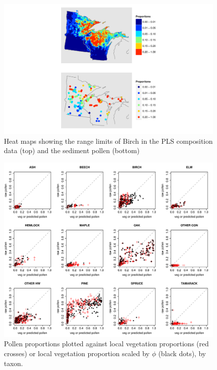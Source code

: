 \begin{figure}
\centering
\includegraphics[width=7in]{figures/maps_compare_BIRCH.pdf}
\caption{Heat maps showing the range limits of Birch in the PLS composition data (top) and the sediment pollen (bottom)}
\label{fig:compare_maps_BIRCH}
\end{figure}

\begin{figure}
\centering
\includegraphics[width=7in]{figures/pollen_focal_scaled_G.pdf}
\caption{Pollen proportions plotted against local vegetation proportions (red crosses) or local vegetation proportion scaled by $\phi$ (black dots), by taxon.}
\label{fig:focal_scaled}
\end{figure}

